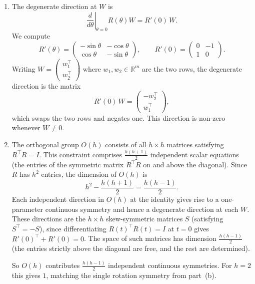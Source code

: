 \documentclass[11pt]{article}
\newcommand{\R}{\mathbb{R}}
\begin{document}
\begin{solution}
\begin{enumerate}
    \item The degenerate direction at $W$ is
    \begin{equation*}
        \left.\frac{d}{d\theta}\right|_{\theta=0} R(\theta) W = R'(0)\, W.
    \end{equation*}
    We compute
    \begin{equation*}
        R'(\theta)
        = \begin{pmatrix}
            -\sin\theta & -\cos\theta \\
            \cos\theta & -\sin\theta
        \end{pmatrix},
        \qquad
        R'(0)
        = \begin{pmatrix}
            0 & -1 \\
            1 & 0
        \end{pmatrix}.
    \end{equation*}
    Writing $W = \begin{pmatrix} w_1^\top \\ w_2^\top \end{pmatrix}$ where $w_1, w_2 \in \R^m$ are the two rows, the degenerate direction is the matrix
    \begin{equation*}
        R'(0)\, W
        = \begin{pmatrix} -w_2^\top \\ w_1^\top \end{pmatrix},
    \end{equation*}
    which swaps the two rows and negates one. This direction is non-zero whenever $W \neq 0$.

    \item The orthogonal group $O(h)$ consists of all $h \times h$ matrices satisfying $R^\top R = I$. This constraint comprises $\frac{h(h+1)}{2}$ independent scalar equations (the entries of the symmetric matrix $R^\top R$ on and above the diagonal). Since $R$ has $h^2$ entries, the dimension of $O(h)$ is
    \begin{equation*}
        h^2 - \frac{h(h+1)}{2} = \frac{h(h-1)}{2}.
    \end{equation*}
    Each independent direction in $O(h)$ at the identity gives rise to a one-parameter continuous symmetry and hence a degenerate direction at each $W$. These directions are the $h \times h$ skew-symmetric matrices $S$ (satisfying $S^\top = -S$), since differentiating $R(t)^\top R(t) = I$ at $t = 0$ gives $R'(0)^\top + R'(0) = 0$. The space of such matrices has dimension $\frac{h(h-1)}{2}$ (the entries strictly above the diagonal are free, and the rest are determined).

    So $O(h)$ contributes $\frac{h(h-1)}{2}$ independent continuous symmetries. For $h = 2$ this gives $1$, matching the single rotation symmetry from part~(b). \qedhere
\end{enumerate}
\end{solution}
\end{document}
